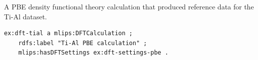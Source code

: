 A PBE density functional theory calculation that produced reference data for the Ti-Al dataset.
\begin{lstlisting}[language=turtle]
ex:dft-tial a mlips:DFTCalculation ;
    rdfs:label "Ti-Al PBE calculation" ;
    mlips:hasDFTSettings ex:dft-settings-pbe .
\end{lstlisting}
